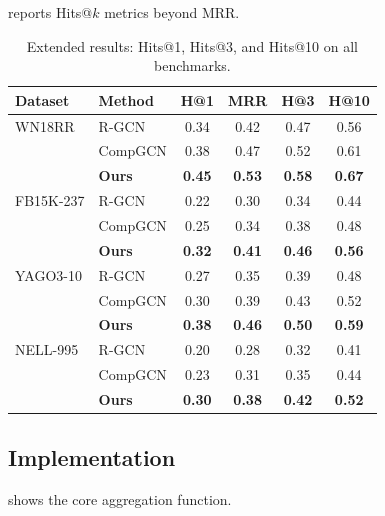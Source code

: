\documentclass[
    language=english,
    doctype=article,
    institution=none,
]{../../omnilatex}
\theoremstyle{definition}
\theoremstyle{definition}
\theoremstyle{remark}
\begin{document}
 reports Hits@\(k\) metrics beyond MRR.

\begin{table}[htbp]
    \centering
    \caption{Extended results: Hits@1, Hits@3, and Hits@10 on all benchmarks.}
    \label{tab:extended}
    \begin{tabular}{@{}llcccc@{}}
        \toprule
        \textbf{Dataset} & \textbf{Method}
            & \textbf{H@1} & \textbf{MRR}
            & \textbf{H@3} & \textbf{H@10} \\
        \midrule
        WN18RR
            & R-GCN   & 0.34 & 0.42 & 0.47 & 0.56 \\
            & CompGCN & 0.38 & 0.47 & 0.52 & 0.61 \\
            & \textbf{Ours} & \textbf{0.45} & \textbf{0.53} & \textbf{0.58} & \textbf{0.67} \\
        \midrule
        FB15K-237
            & R-GCN   & 0.22 & 0.30 & 0.34 & 0.44 \\
            & CompGCN & 0.25 & 0.34 & 0.38 & 0.48 \\
            & \textbf{Ours} & \textbf{0.32} & \textbf{0.41} & \textbf{0.46} & \textbf{0.56} \\
        \midrule
        YAGO3-10
            & R-GCN   & 0.27 & 0.35 & 0.39 & 0.48 \\
            & CompGCN & 0.30 & 0.39 & 0.43 & 0.52 \\
            & \textbf{Ours} & \textbf{0.38} & \textbf{0.46} & \textbf{0.50} & \textbf{0.59} \\
        \midrule
        NELL-995
            & R-GCN   & 0.20 & 0.28 & 0.32 & 0.41 \\
            & CompGCN & 0.23 & 0.31 & 0.35 & 0.44 \\
            & \textbf{Ours} & \textbf{0.30} & \textbf{0.38} & \textbf{0.42} & \textbf{0.52} \\
        \bottomrule
    \end{tabular}
\end{table}

\subsection{Implementation}

 shows the core aggregation function.
\end{document}
